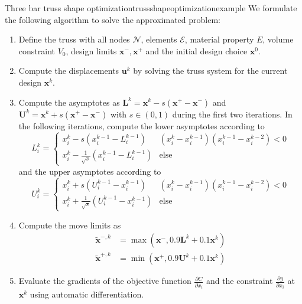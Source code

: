 \begin{example}{Three bar truss shape optimization}{trussshapeoptimizationexample}
    We formulate the following algorithm to solve the approximated problem: 
    \begin{enumerate}
        \item Define the truss with all nodes $\mathcal{N}$, elements $\mathcal{E}$, material property $E$, volume constraint $V_0$, design limits $\mathbf{x}^-, \mathbf{x}^+$ and the initial design choice $\mathbf{x}^0$.
        \item Compute the displacements $\mathbf{u}^k$ by solving the truss system for the current design $\mathbf{x}^k$.
        \item Compute the asymptotes as $\mathbf{L}^k =\mathbf{x}^k - s (\mathbf{x}^+ - \mathbf{x}^-)$ and $\mathbf{U}^k =\mathbf{x}^k + s (\mathbf{x}^+ - \mathbf{x}^-)$ with $s \in (0,1)$ during the first two iterations. In the following iterations, compute the lower asymptotes according to 
        \begin{equation}
            L^k_i = 
            \begin{cases}
                x^k_i - s  (x^{k-1}_i-L^{k-1}_i) & (x_i^k-x_i^{k-1})(x_i^{k-1}-x_i^{k-2}) < 0\\
                x^k_i - \frac{1}{\sqrt{s}}  (x^{k-1}_i-L^{k-1}_i) & \text{else}
            \end{cases}
        \end{equation}
        and the upper asymptotes according to 
        \begin{equation}
            U^k_i = 
            \begin{cases}
                x^k_i + s  (U^{k-1}_i-x^{k-1}_i) & (x_i^k-x_i^{k-1})(x_i^{k-1}-x_i^{k-2}) < 0\\
                x^k_i + \frac{1}{\sqrt{s}}  (U^{k-1}_i-x^{k-1}_i) & \text{else}
            \end{cases}
        \end{equation}

        \item Compute the move limits as 
        \begin{align}
            \tilde{\mathbf{x}}^{-,k} &= \max(\mathbf{x}^-,  0.9 \mathbf{L}^k + 0.1 \mathbf{x}^k) \\
            \tilde{\mathbf{x}}^{+,k} &= \min(\mathbf{x}^+,  0.9 \mathbf{U}^k + 0.1 \mathbf{x}^k)
        \end{align}

        \item Evaluate the gradients of the objective function $\frac{\partial C}{\partial x_i}$ and the constraint $\frac{\partial g}{\partial x_i}$ at $\mathbf{x}^k$ using automatic differentiation. 


\end{enumerate}
\end{example}
